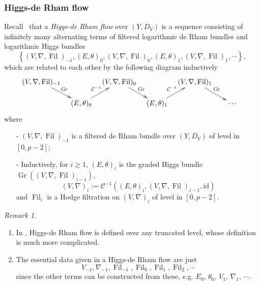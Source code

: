 \documentclass[12pt,twoside]{book}
\theoremstyle{plain}
\theoremstyle{definition}
\theoremstyle{remark}
\newtheorem{remark}[remark]{Remark}
\newcommand{\mC}{{\mathcal C}}
\DeclareMathOperator\Fil{Fil}
\DeclareMathOperator\Gr{Gr}
\numberwithin{equation}{section}
\begin{document}
\subsubsection{Higgs-de Rham flow}
Recall~\cite{LSZ19} that a \emph{Higgs-de Rham flow} over $(Y,D_Y)$ is a sequence consisting of infinitely many alternating terms of filtered logarithmic de Rham bundles and logarithmic Higgs bundles
\[\left\{
(V,\nabla,\Fil)_{-1},
(E,\theta)_{0},
(V,\nabla,\Fil)_{0},
(E,\theta)_{1},
(V,\nabla,\Fil)_{1},
\cdots\right\},\]
which are related to each other by the following diagram inductively
\begin{equation} \label{diag:HDF}
\xymatrix@W=10mm@C=3mm@R=5mm{
(V,\nabla,\Fil)_{-1} \ar[dr]^{\Gr} && (V,\nabla,\Fil)_{0}\ar[dr]^{\Gr}
&& (V,\nabla,\Fil)_{1}\ar[dr]^{\Gr}
&\\
& (E,\theta)_{0} \ar[ur]^{\mC^{-1}}
&& (E,\theta)_{1} \ar[ur]^{\mC^{-1}}
&& \cdots\\
}
\end{equation}
where
\begin{itemize}
\item[-] $(V,\nabla,\Fil)_{-1}$ is a filtered de Rham bundle over $(Y,D_Y)$ of level in $[0,p-2]$;
\item[-] Inductively, for $i\geq1$, $(E,\theta)_i$ is the graded Higgs bundle $\Gr\left((V,\nabla,\Fil)_{i-1}\right)$, \[(V,\nabla)_i:=\mC^{-1} ((E,\theta)_i,(V,\nabla,\Fil)_{i-1} ,\mathrm{id})\]
and $\Fil_i$ is a Hodge filtration on $(V,\nabla)_i$ of level in $[0,p-2]$.
\end{itemize}

\begin{remark}
\begin{enumerate}
\item In \cite{LSZ19}, Higgs-de Rham flow is defined over any truncated level, whose definition is much more complicated.
\item The essential data given in a Higgs-de Rham flow are just
\[V_{-1},\nabla_{-1},\Fil_{-1},\Fil_{0},\Fil_{1},\Fil_{2},\cdots\]
since the other terms can be constructed from these, e.g. $E_0$, $\theta_0$, $V_1$, $\nabla_1$, $\cdots$.
\end{enumerate}
\end{remark}
\end{document}
